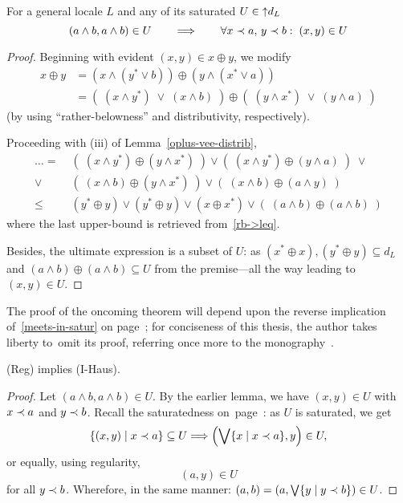 \begin{lem}
  For a general locale $L$ and any of its saturated $U\in \left\uparrow
  d_L\right.$
  \[
    (a \wedge b, a \wedge b) \in U \qquad \Longrightarrow \qquad \forall x \prec
    a, \, y \prec b: \; (x, y) \in U
  \]
\end{lem}
\begin{proof}
  Beginning with evident $(x, y)\in x \oplus y$, we modify
  \begin{align*}
    x \oplus y &= (x \wedge (y^* \vee b)) \oplus (y \wedge (x^* \vee a)) \\
               &= (\; (x \wedge y^*) \; \vee \; (x \wedge b) \; ) \oplus (\; (y
    \wedge x^*) \; \vee \; (y \wedge a) \; )
  \end{align*}
  (by using ``rather-belowness'' and distributivity, respectively).

  Proceeding with (iii) of Lemma~\ref{oplus-vee-distrib}\thinspace,
  \begin{align*}
     \ldots = \; &(\; (x \wedge y^*) \oplus (y \wedge x^*) \; ) \vee 
            (\; (x \wedge y^*) \oplus (y \wedge a) \; ) \; \vee \\
            \vee \; &(\; (x \wedge b) \oplus (y \wedge x^*) \; ) \vee
            (\; (x \wedge b) \oplus (a \wedge y) \; ) \\
     \leq \; &(y^*\oplus y) \vee (y^*\oplus y) \vee (x\oplus x^*) \vee
                  (\; (a \wedge b)\oplus(a \wedge b) \;)
  \end{align*}
  where the last upper-bound is retrieved from~\ref{rb->leq}\thinspace.

  Besides, the ultimate expression is a subset of $U$:
  as $(x^*\oplus x), (y^*\oplus y)\subseteq d_L$ and $(a \wedge b)\oplus(a
  \wedge b)\subseteq U$ from the premise---all the way leading to $(x, y)\in
  U$.
\end{proof}

The proof of the oncoming theorem will depend upon the reverse implication
of~\ref{meets-in-satur} on page~\pageref{meets-in-satur}\thinspace;
for conciseness of this thesis, the author takes liberty to~omit its proof,
referring once more to the monography~\cite{picado-pultr12}.

\begin{thm}
  (Reg) implies (I-Haus).
\end{thm}
\begin{proof}
  Let $(a \wedge b, a \wedge b) \in U$.
  By the earlier lemma, we have $(x, y)\in U$ with $x \prec a$ and $y \prec b$.
  Recall the saturatedness on~page~\pageref{df:satur}\thinspace:
  as $U$ is saturated, we get
  \[
    \left\{ (x, y) \mid x \prec a \right\} \subseteq U
    \Longrightarrow
    \left(\bigvee \{x \mid x \prec a\}, y\right)\in U,
  \]
  or equally, using regularity,
  \[
    \left(a, y\right)\in U
  \]
  for all $y \prec b$.
  Wherefore, in the same manner: $(a, b) = \left(a, \bigvee \{y \mid y \prec
  b\}\right)\in U$.
\end{proof}

